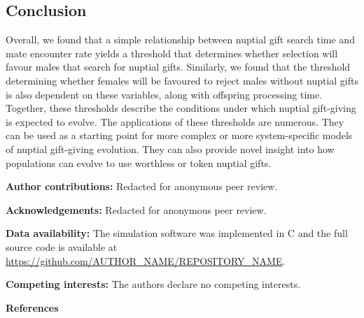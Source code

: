 \documentclass[
]{article}
\begin{document}
\hypertarget{conclusion}{%
\subsection{Conclusion}\label{conclusion}}

Overall, we found that a simple relationship between nuptial gift search
time and mate encounter rate yields a threshold that determines whether
selection will favour males that search for nuptial gifts. Similarly, we
found that the threshold determining whether females will be favoured to
reject males without nuptial gifts is also dependent on these variables,
along with offspring processing time. Together, these thresholds
describe the conditions under which nuptial gift-giving is expected to
evolve. The applications of these thresholds are numerous. They can be
used as a starting point for more complex or more system-specific models
of nuptial gift-giving evolution. They can also provide novel insight
into how populations can evolve to use worthless or token nuptial gifts.

\textbf{Author contributions:} Redacted for anonymous peer review.

\textbf{Acknowledgements:} Redacted for anonymous peer review.

\textbf{Data availability:} The simulation software was implemented in C
and the full source code is available at
\url{https://github.com/AUTHOR_NAME/REPOSITORY_NAME}.

\textbf{Competing interests:} The authors declare no competing
interests.

\textbf{References}
\end{document}

